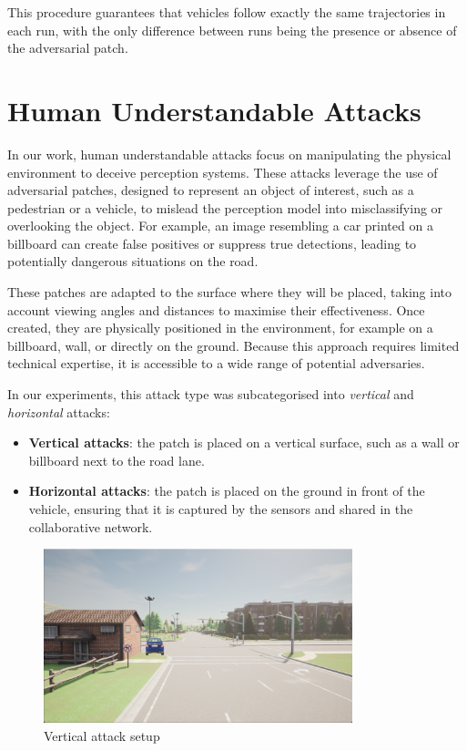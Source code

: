 This procedure guarantees that vehicles follow exactly the same trajectories in each run, with the only difference between runs being the presence or absence of the adversarial patch.


\section{Human Understandable Attacks}

In our work, human understandable attacks focus on manipulating the physical environment to deceive perception systems.
These attacks leverage the use of adversarial patches, designed to represent an object of interest, such as a pedestrian or a vehicle, to mislead the perception model into misclassifying or overlooking the object.
For example, an image resembling a car printed on a billboard can create false positives or suppress true detections, leading to potentially dangerous situations on the road.

These patches are adapted to the surface where they will be placed, taking into account viewing angles and distances to maximise their effectiveness.
Once created, they are physically positioned in the environment, for example on a billboard, wall, or directly on the ground.
Because this approach requires limited technical expertise, it is accessible to a wide range of potential adversaries.

In our experiments, this attack type was subcategorised into \textit{vertical} and \textit{horizontal} attacks:
\begin{itemize}
    \item \textbf{Vertical attacks}: the patch is placed on a vertical surface, such as a wall or billboard next to the road lane.
    \item \textbf{Horizontal attacks}: the patch is placed on the ground in front of the vehicle, ensuring that it is captured by the sensors and shared in the collaborative network.
\end{itemize}

\begin{figure}[ht]
    \centering
    \includegraphics[width=0.8\textwidth]{figures/attacks_framework/vertical_attack.png}
    \caption{Vertical attack setup}
    \label{fig:vertical_attack}
\end{figure}

